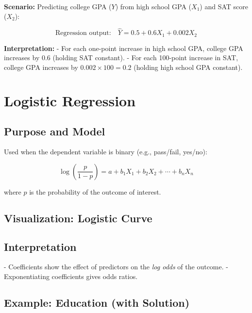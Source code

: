 \documentclass[11pt]{article}
\begin{document}
\textbf{Scenario:} Predicting college GPA ($Y$) from high school GPA ($X_1$) and SAT score ($X_2$):

\[
\text{Regression output:} \quad \hat{Y} = 0.5 + 0.6 X_1 + 0.002 X_2
\]

\textbf{Interpretation:}
- For each one-point increase in high school GPA, college GPA increases by 0.6 (holding SAT constant).
- For each 100-point increase in SAT, college GPA increases by $0.002 \times 100 = 0.2$ (holding high school GPA constant).

\section{Logistic Regression}

\subsection{Purpose and Model}

Used when the dependent variable is binary (e.g., pass/fail, yes/no):

\[
\log\left( \frac{p}{1-p} \right) = a + b_1 X_1 + b_2 X_2 + \cdots + b_n X_n
\]

where $p$ is the probability of the outcome of interest.

\subsection*{Visualization: Logistic Curve}
\begin{center}
\end{center}

\subsection{Interpretation}

- Coefficients show the effect of predictors on the \emph{log odds} of the outcome.
- Exponentiating coefficients gives odds ratios.

\subsection{Example: Education (with Solution)}
\end{document}
